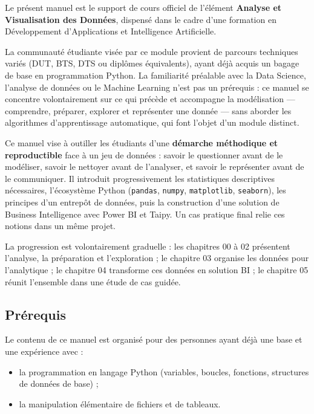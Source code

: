 \documentclass[
  french,
  letterpaper,
  open=any]{scrbook}
\providecommand{\tightlist}{%
  \setlength{\itemsep}{0pt}\setlength{\parskip}{0pt}}
\theoremstyle{definition}
\theoremstyle{definition}
\theoremstyle{remark}
\begin{document}
Le présent manuel est le support de cours officiel de l'élément
\textbf{Analyse et Visualisation des Données}, dispensé dans le cadre
d'une formation en Développement d'Applications et Intelligence
Artificielle.

La communauté étudiante visée par ce module provient de parcours
techniques variés (DUT, BTS, DTS ou diplômes équivalents), ayant déjà
acquis un bagage de base en programmation Python. La familiarité
préalable avec la Data Science, l'analyse de données ou le Machine
Learning n'est pas un prérequis : ce manuel se concentre volontairement
sur ce qui précède et accompagne la modélisation --- comprendre,
préparer, explorer et représenter une donnée --- sans aborder les
algorithmes d'apprentissage automatique, qui font l'objet d'un module
distinct.

Ce manuel vise à outiller les étudiants d'une \textbf{démarche
méthodique et reproductible} face à un jeu de données : savoir le
questionner avant de le modéliser, savoir le nettoyer avant de
l'analyser, et savoir le représenter avant de le communiquer. Il
introduit progressivement les statistiques descriptives nécessaires,
l'écosystème Python (\texttt{pandas}, \texttt{numpy},
\texttt{matplotlib}, \texttt{seaborn}), les principes d'un entrepôt de
données, puis la construction d'une solution de Business Intelligence
avec Power BI et Taipy. Un cas pratique final relie ces notions dans un
même projet.

La progression est volontairement graduelle : les chapitres 00 à 02
présentent l'analyse, la préparation et l'exploration ; le chapitre 03
organise les données pour l'analytique ; le chapitre 04 transforme ces
données en solution BI ; le chapitre 05 réunit l'ensemble dans une étude
de cas guidée.

\subsection*{Prérequis}

Le contenu de ce manuel est organisé pour des personnes ayant déjà une
base et une expérience avec :

\begin{itemize}
\tightlist
\item
  la programmation en langage Python (variables, boucles, fonctions,
  structures de données de base) ;
\item
  la manipulation élémentaire de fichiers et de tableaux.
\end{itemize}
\end{document}
